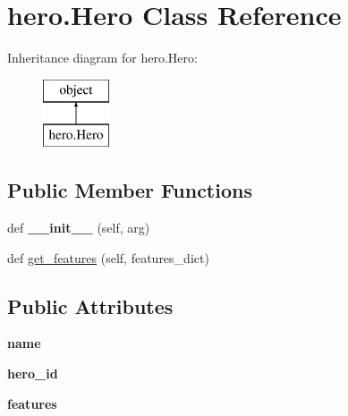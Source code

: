 \hypertarget{classhero_1_1_hero}{}\section{hero.\+Hero Class Reference}
\label{classhero_1_1_hero}
Inheritance diagram for hero.\+Hero\+:\begin{figure}[H]
\begin{center}
\leavevmode
\includegraphics[height=2.000000cm]{classhero_1_1_hero}
\end{center}
\end{figure}
\subsection*{Public Member Functions}
\begin{DoxyCompactItemize}
\item 
def {\bfseries \+\_\+\+\_\+init\+\_\+\+\_\+} (self, arg)\hypertarget{classhero_1_1_hero_af248f7efb52f1b68da13533365e7808c}{}\label{classhero_1_1_hero_af248f7efb52f1b68da13533365e7808c}

\item 
def \hyperlink{classhero_1_1_hero_af015b2d88289932b884a27351f76ebda}{get\+\_\+features} (self, features\+\_\+dict)
\end{DoxyCompactItemize}
\subsection*{Public Attributes}
\begin{DoxyCompactItemize}
\item 
{\bfseries name}\hypertarget{classhero_1_1_hero_a9fd2ce620b7f00d3c51235a6ae68f6b1}{}\label{classhero_1_1_hero_a9fd2ce620b7f00d3c51235a6ae68f6b1}

\item 
{\bfseries hero\+\_\+id}\hypertarget{classhero_1_1_hero_ac6ab19abf39b947bb48d6f9c8d0327d8}{}\label{classhero_1_1_hero_ac6ab19abf39b947bb48d6f9c8d0327d8}

\item 
{\bfseries features}\hypertarget{classhero_1_1_hero_ae2955630410dde353e1776ac38ae4cc6}{}\label{classhero_1_1_hero_ae2955630410dde353e1776ac38ae4cc6}

\end{DoxyCompactItemize}


